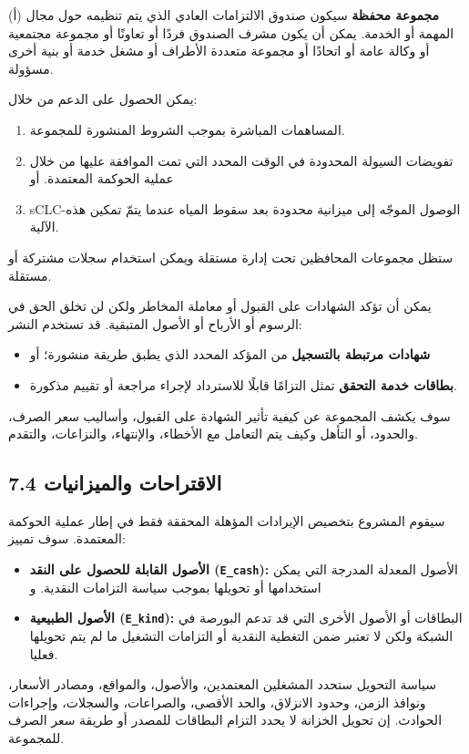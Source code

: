 \documentclass[11pt]{article}
\begin{document}
(أ) \textbf{مجموعة محفظة} سيكون صندوق الالتزامات العادي الذي يتم تنظيمه حول مجال المهمة أو الخدمة. يمكن أن يكون مشرف الصندوق فردًا أو تعاونًا أو مجموعة مجتمعية أو وكالة عامة أو اتحادًا أو مجموعة متعددة الأطراف أو مشغل خدمة أو بنية أخرى مسؤولة.

يمكن الحصول على الدعم من خلال:

\begin{enumerate}[leftmargin=*]
\item المساهمات المباشرة بموجب الشروط المنشورة للمجموعة.
\item تفويضات السيولة المحدودة في الوقت المحدد التي تمت الموافقة عليها من خلال عملية الحوكمة المعتمدة. أو
\item sCLC-الوصول الموجّه إلى ميزانية محدودة بعد سقوط المياه عندما يتمّ تمكين هذه الآلية.
\end{enumerate}
ستظل مجموعات المحافظين تحت إدارة مستقلة ويمكن استخدام سجلات مشتركة أو مستقلة.

يمكن أن تؤكد الشهادات على القبول أو معاملة المخاطر ولكن لن تخلق الحق في الرسوم أو الأرباح أو الأصول المتبقية. قد تستخدم النشر:

\begin{itemize}[leftmargin=*]
\item \textbf{شهادات مرتبطة بالتسجيل} من المؤكد المحدد الذي يطبق طريقة منشورة؛ أو
\item \textbf{بطاقات خدمة التحقق} تمثل التزامًا قابلًا للاسترداد لإجراء مراجعة أو تقييم مذكورة.
\end{itemize}
سوف يكشف المجموعة عن كيفية تأثير الشهادة على القبول، وأساليب سعر الصرف، والحدود، أو التأهل وكيف يتم التعامل مع الأخطاء، والإنتهاء، والنزاعات، والتقدم.

\subsection*{7.4 الاقتراحات والميزانيات}

سيقوم المشروع بتخصيص الإيرادات المؤهلة المحققة فقط في إطار عملية الحوكمة المعتمدة. سوف تمييز:

\begin{itemize}[leftmargin=*]
\item \textbf{الأصول القابلة للحصول على النقد (\texttt{E\_cash}):} الأصول المعدلة المدرجة التي يمكن استخدامها أو تحويلها بموجب سياسة التزامات النقدية. و
\item \textbf{الأصول الطبيعية (\texttt{E\_kind}):} البطاقات أو الأصول الأخرى التي قد تدعم البورصة في الشبكة ولكن لا تعتبر ضمن التغطية النقدية أو التزامات التشغيل ما لم يتم تحويلها فعليا.
\end{itemize}
سياسة التحويل ستحدد المشغلين المعتمدين، والأصول، والمواقع، ومصادر الأسعار، ونوافذ الزمن، وحدود الانزلاق، والحد الأقصى، والصراعات، والسجلات، وإجراءات الحوادث. إن تحويل الخزانة لا يحدد التزام البطاقات للمصدر أو طريقة سعر الصرف للمجموعة.
\end{document}
